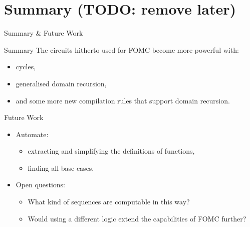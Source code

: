 \documentclass{beamer}
\begin{document}
\section{Summary (TODO: remove later)}

\begin{frame}{Summary \& Future Work}
  \begin{block}{Summary}
    The circuits hitherto used for FOMC become more powerful with:
    \begin{itemize}
    \item cycles,
    \item generalised domain recursion,
    \item and some more new compilation rules that support domain recursion.
    \end{itemize}
  \end{block}
  \begin{block}{Future Work}
    \begin{itemize}
    \item Automate:
      \begin{itemize}
      \item extracting and simplifying the definitions of functions,
      \item finding all base cases.
      \end{itemize}
    \item Open questions:
      \begin{itemize}
      \item What kind of \alert{sequences} are computable in this way?
      \item Would using a \alert{different logic} extend the capabilities of FOMC further?
      \end{itemize}
    \end{itemize}
  \end{block}
\end{frame}
\end{document}
